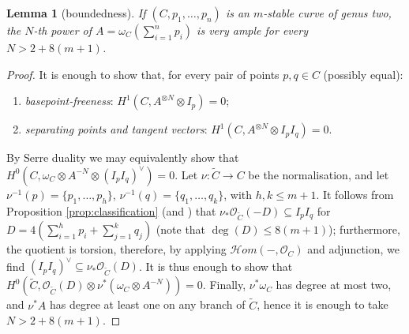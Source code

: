\documentclass[11pt]{amsart}
\newcommand{\OO}{\mathcal O}
\renewcommand{\to}{\rightarrow}
\newcommand{\hhom}{\mathcal{H}\!om}
\theoremstyle{plain}
\newtheorem{lem}[thm]{Lemma}
\theoremstyle{definition}
\begin{document}
\begin{lem}[boundedness]
 If $(C,p_1,\ldots,p_n)$ is an $m$-stable curve of genus two, the $N$-th power of $A=\omega_C(\sum_{i=1}^np_i)$ is very ample for every $N>2+8(m+1)$.
\end{lem}
\begin{proof}
 It is enough to show that, for every pair of points $p,q\in C$ (possibly equal):
 \begin{enumerate}
  \item \emph{basepoint-freeness}: $H^1(C,A^{\otimes N}\otimes I_p)=0$;
  \item \emph{separating points and tangent vectors}: $H^1(C,A^{\otimes N}\otimes I_pI_q)=0$.
 \end{enumerate}
By Serre duality we may equivalently show that $H^0(C,\omega_C\otimes A^{-N}\otimes(I_pI_q)^\vee)=0$. Let $\nu\colon\tilde C\to C$ be the normalisation, and let $\nu^{-1}(p)=\{p_1,\ldots,p_h\}$, $\nu^{-1}(q)=\{q_1,\ldots,q_k\}$, with $h,k\leq m+1$. It follows from Proposition \ref{prop:classification} (and \cite[Proposition A.3]{SMY1}) that $\nu_*\OO_{\tilde C}(-D)\subseteq I_pI_q$ for $D=4(\sum_{i=1}^hp_i+\sum_{j=1}^kq_j)$ (note that $\deg(D)\leq 8(m+1)$); furthermore, the quotient is torsion, therefore, by applying $\hhom(-,\OO_C)$ and adjunction, we find $(I_pI_q)^\vee\subseteq\nu_*\OO_{\tilde C}(D)$. It is thus enough to show that $H^0(\tilde C,\OO_{\tilde C}(D)\otimes\nu^*(\omega_C\otimes A^{-N}))=0$. Finally, $\nu^*\omega_C$ has degree at most two, and $\nu^*A$ has degree at least one on any branch of $\tilde C$, hence it is enough to take $N>2+8(m+1)$.
\end{proof}
\end{document}
